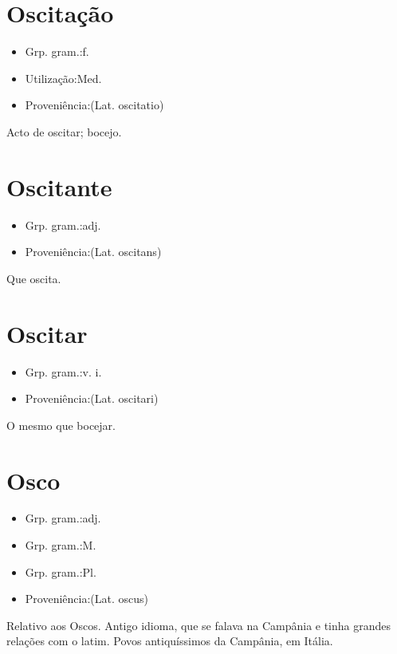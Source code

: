 \section{Oscitação}
\begin{itemize}
\item {Grp. gram.:f.}
\end{itemize}
\begin{itemize}
\item {Utilização:Med.}
\end{itemize}
\begin{itemize}
\item {Proveniência:(Lat. \textunderscore oscitatio\textunderscore )}
\end{itemize}
Acto de oscitar; bocejo.
\section{Oscitante}
\begin{itemize}
\item {Grp. gram.:adj.}
\end{itemize}
\begin{itemize}
\item {Proveniência:(Lat. \textunderscore oscitans\textunderscore )}
\end{itemize}
Que oscita.
\section{Oscitar}
\begin{itemize}
\item {Grp. gram.:v. i.}
\end{itemize}
\begin{itemize}
\item {Proveniência:(Lat. \textunderscore oscitari\textunderscore )}
\end{itemize}
O mesmo que \textunderscore bocejar\textunderscore .
\section{Osco}
\begin{itemize}
\item {Grp. gram.:adj.}
\end{itemize}
\begin{itemize}
\item {Grp. gram.:M.}
\end{itemize}
\begin{itemize}
\item {Grp. gram.:Pl.}
\end{itemize}
\begin{itemize}
\item {Proveniência:(Lat. \textunderscore oscus\textunderscore )}
\end{itemize}
Relativo aos Oscos.
Antigo idioma, que se falava na Campânia e tinha grandes relações com o latim.
Povos antiquíssimos da Campânia, em Itália.
